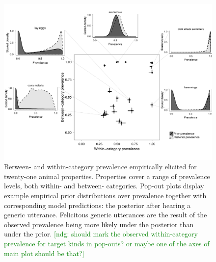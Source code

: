 \documentclass[10pt,letterpaper]{article}
\newcommand{\ndg}[1]{\textcolor{Green}{[ndg: #1]}}
\begin{document}

\begin{figure}
\centering
    \includegraphics[width=\columnwidth]{prevalence-scatter-wDists-black.pdf}
    \caption{Between- and within-category prevalence empirically elicited for twenty-one animal properties.
    Properties cover a range of prevalence levels, both within- and between- categories.
    Pop-out plots display example empirical prior distributions over prevalence together with corresponding model predictions: the posterior after hearing a generic utterance. 
    Felicitous generic utterances are the result of the observed prevalence being more likely under the posterior than under the prior.
    \ndg{should mark the observed within-category prevalence for target kinds in pop-outs? or maybe one of the axes of main plot should be that?}
    }
  \label{fig:priors1a}
\end{figure}
\end{document}
